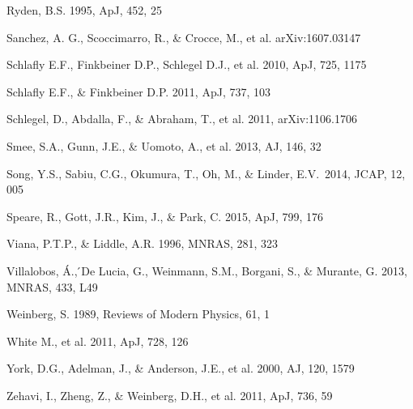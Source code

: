 \documentclass[iop]{emulateapj}
\begin{document}
\begin{thebibliography}{}
Ryden, B.S. 1995, ApJ, 452, 25  





Sanchez, A. G., Scoccimarro, R., \& Crocce, M., et al.
arXiv:1607.03147

Schlafly E.F., Finkbeiner D.P., Schlegel D.J., et al. 2010, ApJ, 725, 1175

Schlafly E.F., \& Finkbeiner D.P. 2011, ApJ, 737, 103


Schlegel, D., Abdalla, F., \& Abraham, T., et al. 2011, arXiv:1106.1706

Smee, S.A., Gunn, J.E., \& Uomoto, A., et al. 2013, AJ, 146, 32

Song, Y.S., Sabiu, C.G., 
Okumura, T., Oh, M., \& Linder, E.V.\ 2014, JCAP, 12, 005 

Speare, R., Gott, J.R., Kim, J., \& Park, C.
2015, ApJ, 799, 176



Viana, P.T.P., \& Liddle, A.R. 1996, MNRAS, 281, 323

Villalobos, \'{A}., ́De Lucia, G., Weinmann, S.M., Borgani, S., \& Murante, G. 2013, MNRAS, 433, L49


Weinberg, S. 1989, Reviews of Modern Physics, 61, 1

White M., et al. 2011, ApJ, 728, 126

York, D.G., Adelman, J., \& Anderson, J.E., et al. 2000, AJ, 120, 1579

Zehavi, I., Zheng, Z., \& Weinberg, D.H., et al. 2011, ApJ, 736, 59




\end{thebibliography}
\end{document}
